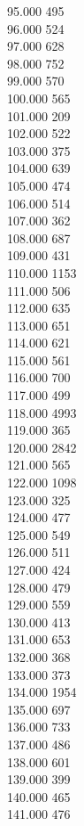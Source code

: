 { 95.000	495 \\
 96.000	524 \\
 97.000	628 \\
 98.000	752 \\
 99.000	570 \\
 100.000	565 \\
 101.000	209 \\
 102.000	522 \\
 103.000	375 \\
 104.000	639 \\
 105.000	474 \\
 106.000	514 \\
 107.000	362 \\
 108.000	687 \\
 109.000	431 \\
 110.000	1153 \\
 111.000	506 \\
 112.000	635 \\
 113.000	651 \\
 114.000	621 \\
 115.000	561 \\
 116.000	700 \\
 117.000	499 \\
 118.000	4993 \\
 119.000	365 \\
 120.000	2842 \\
 121.000	565 \\
 122.000	1098 \\
 123.000	325 \\
 124.000	477 \\
 125.000	549 \\
 126.000	511 \\
 127.000	424 \\
 128.000	479 \\
 129.000	559 \\
 130.000	413 \\
 131.000	653 \\
 132.000	368 \\
 133.000	373 \\
 134.000	1954 \\
 135.000	697 \\
 136.000	733 \\
 137.000	486 \\
 138.000	601 \\
 139.000	399 \\
 140.000	465 \\
 141.000	476 \\
}
